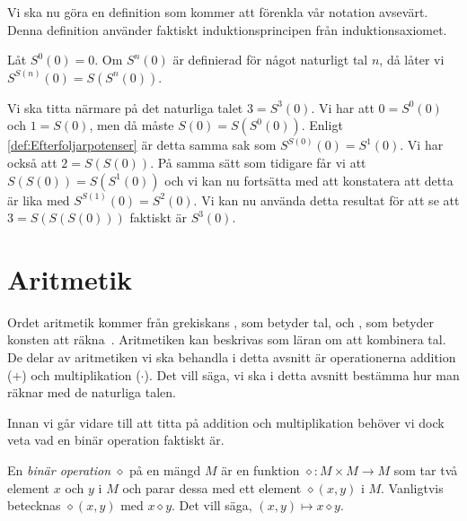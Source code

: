 Vi ska nu göra en definition som kommer att förenkla vår notation avsevärt.
Denna definition använder faktiskt induktionsprincipen från induktionsaxiomet.
\begin{definition}\label{def:Efterfoljarpotenser}
  Låt \(S^0(0) = 0\).
  Om \(S^n(0)\) är definierad för något naturligt tal \(n\), då låter vi
  \(S^{S(n)}(0) = S(S^n(0))\).
\end{definition}
\begin{example}
  Vi ska titta närmare på det naturliga talet \(3=S^3(0)\).
  Vi har att \(0=S^0(0)\) och \(1=S(0)\), men då måste \(S(0)=S(S^0(0))\).
  Enligt \cref{def:Efterfoljarpotenser} är detta samma sak som
  \(S^{S(0)}(0)=S^1(0)\).
  Vi har också att \(2=S(S(0))\).
  På samma sätt som tidigare får vi att \(S(S(0))=S(S^1(0))\) och vi kan nu
  fortsätta med att konstatera att detta är lika med \(S^{S(1)}(0)=S^2(0)\).
  Vi kan nu använda detta resultat för att se att \(3=S(S(S(0)))\) faktiskt
  är \(S^3(0)\).
\end{example}




\section{Aritmetik}%
Ordet aritmetik kommer från grekiskans \emph{},
som betyder tal, och \emph{}, som betyder konsten att
räkna~\cite{OED2013arithmetic}.
Aritmetiken kan beskrivas som läran om att kombinera tal.
De delar av aritmetiken vi ska behandla i detta avsnitt är operationerna
addition (\(+\)) och multiplikation (\(\cdot\)).
Det vill säga, vi ska i detta avsnitt bestämma hur man räknar med de naturliga
talen.

Innan vi går vidare till att titta på addition och multiplikation behöver vi 
dock veta vad en binär operation faktiskt är.
\begin{definition}
  En \emph{binär operation} \(\diamond\) på en mängd
  \(M\) är en funktion \(\diamond\colon M\times M\to M\) som tar två
  element \(x\) och \(y\) i \(M\) och parar dessa med ett element
  \(\diamond(x,y)\) i \(M\).
  Vanligtvis betecknas \(\diamond(x,y)\) med \(x\diamond y\).
  Det vill säga, \((x,y)\mapsto x\diamond y\).
\end{definition}



